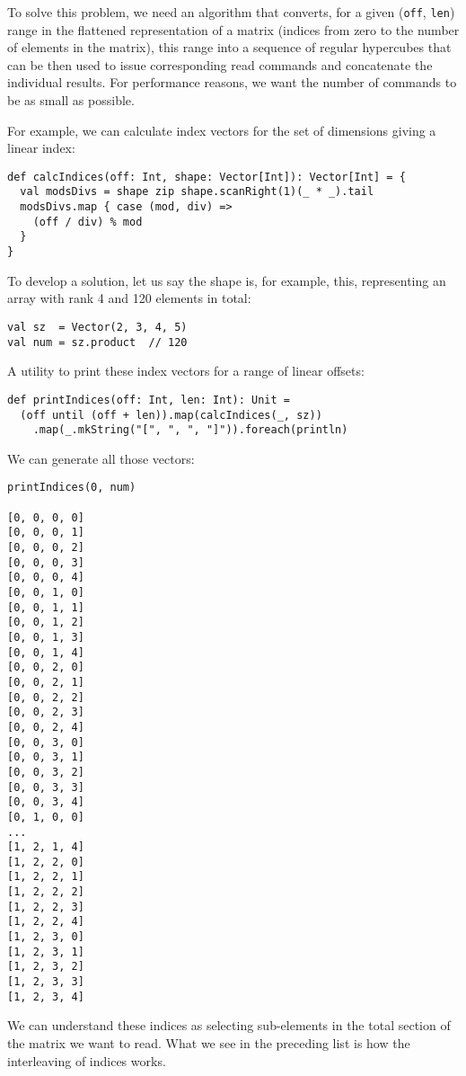 \documentclass[11pt,a4paper]{article}
\begin{document}
To solve this problem, we need an algorithm that converts, for a given (\Verb!off!, \Verb!len!) range in the flattened representation of a matrix (indices from zero to the number of elements in the matrix), this range into a sequence of regular hypercubes that can be then used to issue corresponding read commands and concatenate the individual results. For performance reasons, we want the number of commands to be as small as possible.

For example, we can calculate index vectors for the set of dimensions giving a linear index:
%
\begin{lstlisting}[style=scala]
def calcIndices(off: Int, shape: Vector[Int]): Vector[Int] = {
  val modsDivs = shape zip shape.scanRight(1)(_ * _).tail
  modsDivs.map { case (mod, div) =>
    (off / div) % mod
  }
}
\end{lstlisting}
%
To develop a solution, let us say the shape is, for example, this, representing an array with rank 4 and 120 elements in total:
%
\begin{lstlisting}[style=scala]
val sz  = Vector(2, 3, 4, 5)
val num = sz.product  // 120
\end{lstlisting}
%
A utility to print these index vectors for a range of linear offsets:
%
\begin{lstlisting}[style=scala]
def printIndices(off: Int, len: Int): Unit =
  (off until (off + len)).map(calcIndices(_, sz))
    .map(_.mkString("[", ", ", "]")).foreach(println)
\end{lstlisting}
%
We can generate all those vectors:
%
\begin{lstlisting}[style=scala]
printIndices(0, num)

[0, 0, 0, 0]
[0, 0, 0, 1]
[0, 0, 0, 2]
[0, 0, 0, 3]
[0, 0, 0, 4]
[0, 0, 1, 0]
[0, 0, 1, 1]
[0, 0, 1, 2]
[0, 0, 1, 3]
[0, 0, 1, 4]
[0, 0, 2, 0]
[0, 0, 2, 1]
[0, 0, 2, 2]
[0, 0, 2, 3]
[0, 0, 2, 4]
[0, 0, 3, 0]
[0, 0, 3, 1]
[0, 0, 3, 2]
[0, 0, 3, 3]
[0, 0, 3, 4]
[0, 1, 0, 0]
...
[1, 2, 1, 4]
[1, 2, 2, 0]
[1, 2, 2, 1]
[1, 2, 2, 2]
[1, 2, 2, 3]
[1, 2, 2, 4]
[1, 2, 3, 0]
[1, 2, 3, 1]
[1, 2, 3, 2]
[1, 2, 3, 3]
[1, 2, 3, 4]
\end{lstlisting}
%
We can understand these indices as selecting sub-elements in the
total section of the matrix we want to read. What we see in the preceding list is how the interleaving of indices works.
 
\end{document}
